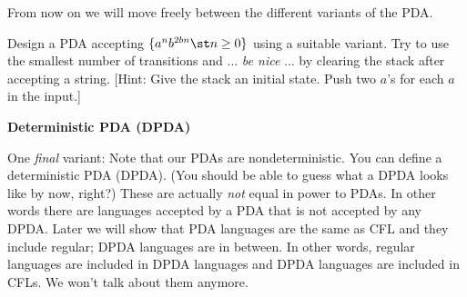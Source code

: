 From now on we will move freely between the different variants of the PDA.

\begin{ex}
Design a PDA accepting $\{ a^n b^{2bn} \st n \geq 0 \}$ using a suitable
variant.
Try to use the smallest number of transitions and ...
\textit{ be nice} ...
by clearing the stack after accepting a string.
[Hint: Give the stack an initial state.
Push two $a$'s for each $a$ in the input.]
\end{ex}

\textbf{Deterministic PDA (DPDA)}

One \textit{ final} variant:
Note that our PDAs are nondeterministic.
You can define a deterministic PDA (DPDA).
(You should be able to guess what a DPDA looks like by now, right?)
These are actually \textit{ not} equal in power to PDAs.
In other words there are languages accepted by a PDA that is not accepted
by any DPDA.
Later we will show that PDA languages are the same as CFL and they include
regular; DPDA languages are in between.
In other words, regular languages are included in DPDA languages and DPDA
languages are included in CFLs.
We won't talk about them anymore.

